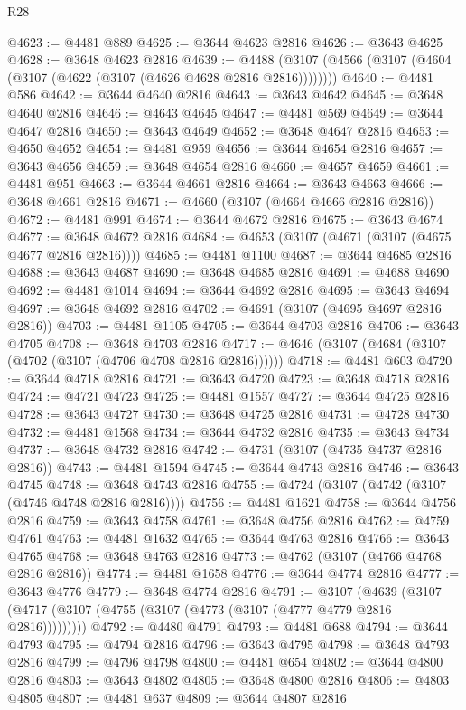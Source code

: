 \begin{lexlean}{R28}
\begin{coremodule}
@4623 := @4481 @889
@4625 := @3644 @4623 @2816
@4626 := @3643 @4625
@4628 := @3648 @4623 @2816
@4639 := @4488 (@3107 (@4566 (@3107 (@4604 (@3107 (@4622 (@3107 (@4626 @4628 @2816 @2816))))))))
@4640 := @4481 @586
@4642 := @3644 @4640 @2816
@4643 := @3643 @4642
@4645 := @3648 @4640 @2816
@4646 := @4643 @4645
@4647 := @4481 @569
@4649 := @3644 @4647 @2816
@4650 := @3643 @4649
@4652 := @3648 @4647 @2816
@4653 := @4650 @4652
@4654 := @4481 @959
@4656 := @3644 @4654 @2816
@4657 := @3643 @4656
@4659 := @3648 @4654 @2816
@4660 := @4657 @4659
@4661 := @4481 @951
@4663 := @3644 @4661 @2816
@4664 := @3643 @4663
@4666 := @3648 @4661 @2816
@4671 := @4660 (@3107 (@4664 @4666 @2816 @2816))
@4672 := @4481 @991
@4674 := @3644 @4672 @2816
@4675 := @3643 @4674
@4677 := @3648 @4672 @2816
@4684 := @4653 (@3107 (@4671 (@3107 (@4675 @4677 @2816 @2816))))
@4685 := @4481 @1100
@4687 := @3644 @4685 @2816
@4688 := @3643 @4687
@4690 := @3648 @4685 @2816
@4691 := @4688 @4690
@4692 := @4481 @1014
@4694 := @3644 @4692 @2816
@4695 := @3643 @4694
@4697 := @3648 @4692 @2816
@4702 := @4691 (@3107 (@4695 @4697 @2816 @2816))
@4703 := @4481 @1105
@4705 := @3644 @4703 @2816
@4706 := @3643 @4705
@4708 := @3648 @4703 @2816
@4717 := @4646 (@3107 (@4684 (@3107 (@4702 (@3107 (@4706 @4708 @2816 @2816))))))
@4718 := @4481 @603
@4720 := @3644 @4718 @2816
@4721 := @3643 @4720
@4723 := @3648 @4718 @2816
@4724 := @4721 @4723
@4725 := @4481 @1557
@4727 := @3644 @4725 @2816
@4728 := @3643 @4727
@4730 := @3648 @4725 @2816
@4731 := @4728 @4730
@4732 := @4481 @1568
@4734 := @3644 @4732 @2816
@4735 := @3643 @4734
@4737 := @3648 @4732 @2816
@4742 := @4731 (@3107 (@4735 @4737 @2816 @2816))
@4743 := @4481 @1594
@4745 := @3644 @4743 @2816
@4746 := @3643 @4745
@4748 := @3648 @4743 @2816
@4755 := @4724 (@3107 (@4742 (@3107 (@4746 @4748 @2816 @2816))))
@4756 := @4481 @1621
@4758 := @3644 @4756 @2816
@4759 := @3643 @4758
@4761 := @3648 @4756 @2816
@4762 := @4759 @4761
@4763 := @4481 @1632
@4765 := @3644 @4763 @2816
@4766 := @3643 @4765
@4768 := @3648 @4763 @2816
@4773 := @4762 (@3107 (@4766 @4768 @2816 @2816))
@4774 := @4481 @1658
@4776 := @3644 @4774 @2816
@4777 := @3643 @4776
@4779 := @3648 @4774 @2816
@4791 := @3107
    (@4639 (@3107 (@4717 (@3107 (@4755 (@3107 (@4773 (@3107 (@4777 @4779 @2816 @2816)))))))))
@4792 := @4480 @4791
@4793 := @4481 @688
@4794 := @3644 @4793
@4795 := @4794 @2816
@4796 := @3643 @4795
@4798 := @3648 @4793 @2816
@4799 := @4796 @4798
@4800 := @4481 @654
@4802 := @3644 @4800 @2816
@4803 := @3643 @4802
@4805 := @3648 @4800 @2816
@4806 := @4803 @4805
@4807 := @4481 @637
@4809 := @3644 @4807 @2816

\end{coremodule}
\end{lexlean}
